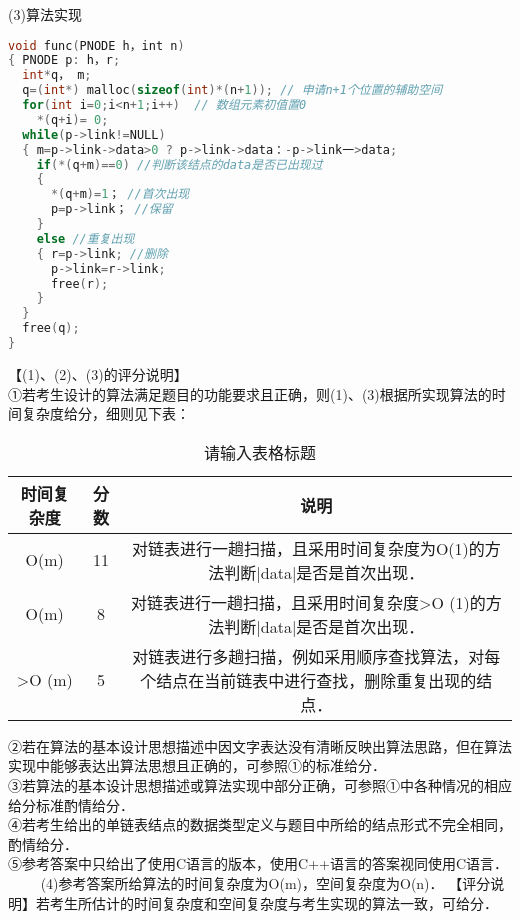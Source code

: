 (3)算法实现 \\
\begin{lstlisting}[language=cpp]
void func(PNODE h，int n)
{ PNODE p: h，r;
  int*q， m;
  q=(int*) malloc(sizeof(int)*(n+1)); // 申请n+1个位置的辅助空间
  for(int i=0;i<n+1;i++)  // 数组元素初值置0
    *(q+i)= 0;
  while(p->link!=NULL)
  { m=p->link->data>0 ? p->link->data：-p->link一>data;
    if(*(q+m)==0) //判断该结点的data是否已出现过
    { 
      *(q+m)=1； //首次出现
      p=p->link； //保留
    }
    else //重复出现
    { r=p->link; //删除
      p->link=r->link;
      free(r);
    }
  }
  free(q);
}
\end{lstlisting}
【(1)、(2)、(3)的评分说明】 \\
①若考生设计的算法满足题目的功能要求且正确，则(1)、(3)根据所实现算法的时间复杂度给分，细则见下表：
\begin{table}[ht]
\centering
\caption{请输入表格标题}\label{CSN15_tab2}
\begin{tabular}{|c|c|c|}
\hline
时间复杂度 &分数 &说明  \\
\hline
O(m) &11 &对链表进行一趟扫描，且采用时间复杂度为O(1)的方法判断|data|是否是首次出现．  \\
\hline
O(m) &8 &对链表进行一趟扫描，且采用时间复杂度>O (1)的方法判断|data|是否是首次出现．  \\
\hline
>O (m) &5 &对链表进行多趟扫描，例如采用顺序查找算法，对每个结点在当前链表中进行查找，删除重复出现的结点．  \\
\hline
\end{tabular}
\end{table}
②若在算法的基本设计思想描述中因文字表达没有清晰反映出算法思路，但在算法实现中能够表达出算法思想且正确的，可参照①的标准给分． \\
③若算法的基本设计思想描述或算法实现中部分正确，可参照①中各种情况的相应给分标准酌情给分．\\
④若考生给出的单链表结点的数据类型定义与题目中所给的结点形式不完全相同，酌情给分． \\
⑤参考答案中只给出了使用C语言的版本，使用C++语言的答案视同使用C语言． \\
$\qquad$ (4)参考答案所给算法的时间复杂度为O(m)，空间复杂度为O(n)．
【评分说明】若考生所估计的时间复杂度和空间复杂度与考生实现的算法一致，可给分．

